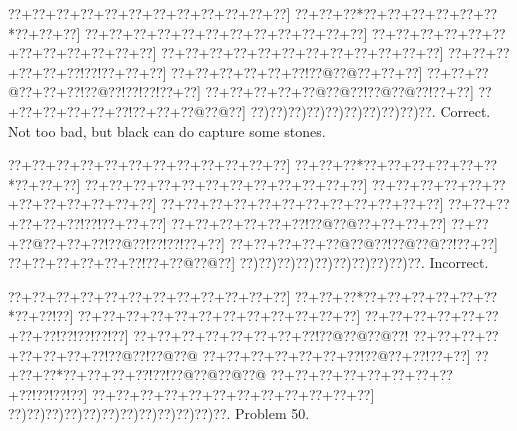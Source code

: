 \documentclass[a5paper]{article}
\begin{document}
\begin{center}
{\goo
\0??+\0??+\0??+\0??+\0??+\0??+\0??+\0??+\0??+\0??+\0??+\0??]
\0??+\0??+\0??*\0??+\0??+\0??+\0??+\0??+\0??*\0??+\0??+\0??]
\0??+\0??+\0??+\0??+\0??+\0??+\0??+\0??+\0??+\0??+\0??+\0??]
\0??+\0??+\0??+\0??+\0??+\0??+\0??+\0??+\0??+\0??+\0??+\0??]
\0??+\0??+\0??+\0??+\0??+\0??+\0??+\0??+\0??+\0??+\0??+\0??]
\0??+\0??+\0??+\0??+\0??+\0??!\0??!\0??+\0??+\0??]
\0??+\0??+\0??+\0??+\0??+\0??!\0??@\0??@\0??+\0??+\0??]
\0??+\0??+\0??@\0??+\0??+\0??!\0??@\0??!\0??!\0??!\0??+\0??]
\0??+\0??+\0??+\0??+\0??@\0??@\0??!\0??@\0??@\0??!\0??+\0??]
\0??+\0??+\0??+\0??+\0??+\0??!\0??+\0??+\0??@\0??@\0??]
\0??)\0??)\0??)\0??)\0??)\0??)\0??)\0??)\0??)\0??.
}
Correct. Not too bad, but black can do capture some stones.

\end{center}
\begin{center}
{\goo
\0??+\0??+\0??+\0??+\0??+\0??+\0??+\0??+\0??+\0??+\0??+\0??]
\0??+\0??+\0??*\0??+\0??+\0??+\0??+\0??+\0??*\0??+\0??+\0??]
\0??+\0??+\0??+\0??+\0??+\0??+\0??+\0??+\0??+\0??+\0??+\0??]
\0??+\0??+\0??+\0??+\0??+\0??+\0??+\0??+\0??+\0??+\0??+\0??]
\0??+\0??+\0??+\0??+\0??+\0??+\0??+\0??+\0??+\0??+\0??+\0??]
\0??+\0??+\0??+\0??+\0??+\0??!\0??!\0??+\0??+\0??]
\0??+\0??+\0??+\0??+\0??+\0??!\0??@\0??@\0??+\0??+\0??+\0??]
\0??+\0??+\0??@\0??+\0??+\0??!\0??@\0??!\0??!\0??!\0??+\0??]
\0??+\0??+\0??+\0??+\0??@\0??@\0??!\0??@\0??@\0??!\0??+\0??]
\0??+\0??+\0??+\0??+\0??+\0??!\0??+\0??@\0??@\0??]
\0??)\0??)\0??)\0??)\0??)\0??)\0??)\0??)\0??)\0??.
}
Incorrect. 

\end{center}
\newpage
\begin{center}
{\goo
\0??+\0??+\0??+\0??+\0??+\0??+\0??+\0??+\0??+\0??+\0??+\0??]
\0??+\0??+\0??*\0??+\0??+\0??+\0??+\0??+\0??*\0??+\0??!\0??]
\0??+\0??+\0??+\0??+\0??+\0??+\0??+\0??+\0??+\0??+\0??+\0??]
\0??+\0??+\0??+\0??+\0??+\0??+\0??+\0??!\0??!\0??!\0??!\0??]
\0??+\0??+\0??+\0??+\0??+\0??+\0??+\0??!\0??@\0??@\0??@\0??!
\0??+\0??+\0??+\0??+\0??+\0??+\0??+\0??!\0??@\0??!\0??@\0??@
\0??+\0??+\0??+\0??+\0??+\0??+\0??!\0??@\0??+\0??!\0??+\0??]
\0??+\0??+\0??*\0??+\0??+\0??+\0??!\0??!\0??@\0??@\0??@\0??@
\0??+\0??+\0??+\0??+\0??+\0??+\0??+\0??+\0??!\0??!\0??!\0??]
\0??+\0??+\0??+\0??+\0??+\0??+\0??+\0??+\0??+\0??+\0??+\0??]
\0??)\0??)\0??)\0??)\0??)\0??)\0??)\0??)\0??)\0??)\0??)\0??.
}
Problem 50.

\end{center}
\end{document}
